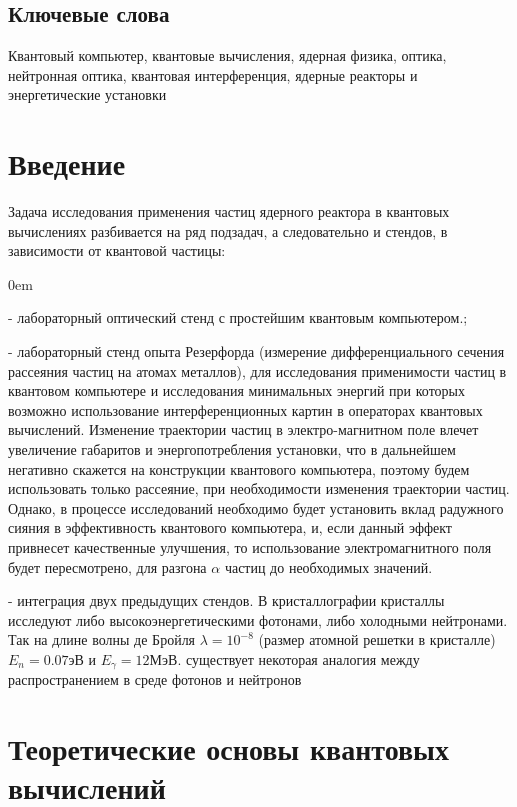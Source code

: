 \documentclass[11pt]{report}
\begin{document}
\section*{Ключевые слова}
Квантовый компьютер, квантовые вычисления, ядерная физика, оптика, нейтронная оптика, квантовая интерференция, ядерные реакторы и энергетические установки

\tableofcontents{}

\chapter{Введение}
Задача исследования применения частиц ядерного реактора в квантовых вычислениях разбивается на ряд  подзадач, а следовательно и стендов, в зависимости от квантовой частицы:
\begin{description}
\addtolength{\itemindent}{0.80cm}
\itemsep0em 
\item[Стенд №1 - фотоны ] - лабораторный оптический стенд с простейшим квантовым компьютером.;
\item[Стенд №2 ($\alpha$, $\beta$)] - лабораторный стенд опыта Резерфорда (измерение дифференциального сечения рассеяния частиц на атомах металлов), для исследования применимости частиц в квантовом компьютере и исследования минимальных энергий при которых возможно использование интерференционных картин в операторах квантовых вычислений. Изменение траектории частиц в электро-магнитном поле влечет увеличение габаритов и энергопотребления установки, что в дальнейшем негативно скажется на конструкции квантового компьютера, поэтому будем использовать только рассеяние, при необходимости изменения траектории частиц. Однако, в процессе исследований необходимо будет установить вклад радужного сияния в эффективность квантового компьютера, и, если данный эффект привнесет качественные улучшения, то использование электромагнитного поля будет пересмотрено, для разгона $\alpha$ частиц до необходимых значений.
\item[Стенд №3 (Лаймоновское излучение, $n$, $\gamma$ )] - интеграция двух предыдущих стендов. В кристаллографии кристаллы исследуют либо высокоэнергетическими фотонами, либо холодными нейтронами. Так на длине волны де Бройля $\lambda=10^{-8}$ (размер атомной решетки в кристалле) $E_n=0.07$эВ и $E_\gamma=12$МэВ. существует некоторая аналогия между распространением в среде фотонов и нейтронов ~\cite{shirokov}

\end{description}

\chapter{Теоретические основы квантовых вычислений}
\end{document}
